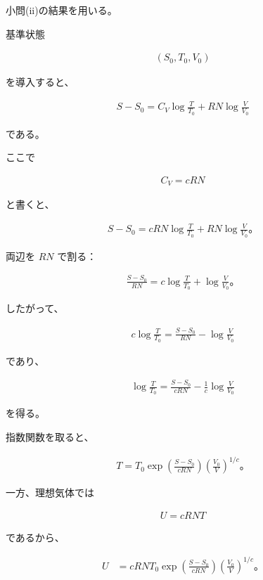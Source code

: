 \documentclass[platex,dvipdfmx,a4paper]{jsarticle}
\begin{document}
小問(ii)の結果を用いる。

基準状態

\begin{align*}
(S_0,T_0,V_0)
\end{align*}

を導入すると、

\begin{align*}
S-S_0
=
C_V\log\frac{T}{T_0}
+
RN\log\frac{V}{V_0}
\end{align*}

である。

ここで

\begin{align*}
C_V=cRN
\end{align*}

と書くと、

\begin{align*}
S-S_0
=
cRN\log\frac{T}{T_0}
+
RN\log\frac{V}{V_0}。
\end{align*}

両辺を $RN$ で割る：

\begin{align*}
\frac{S-S_0}{RN}
=
c\log\frac{T}{T_0}
+
\log\frac{V}{V_0}。
\end{align*}

したがって、

\begin{align*}
c\log\frac{T}{T_0}
=
\frac{S-S_0}{RN}
-\log\frac{V}{V_0}
\end{align*}

であり、

\begin{align*}
\log\frac{T}{T_0}
=
\frac{S-S_0}{cRN}
-\frac{1}{c}\log\frac{V}{V_0}
\end{align*}

を得る。

指数関数を取ると、

\begin{align*}
T
=
T_0
\exp\left(
\frac{S-S_0}{cRN}
\right)
\left(
\frac{V_0}{V}
\right)^{1/c}。
\end{align*}

一方、理想気体では

\begin{align*}
U=cRNT
\end{align*}

であるから、

\begin{align*}
U
&=
cRNT_0
\exp\left(
\frac{S-S_0}{cRN}
\right)
\left(
\frac{V_0}{V}
\right)^{1/c}。
\end{align*}
\end{document}
